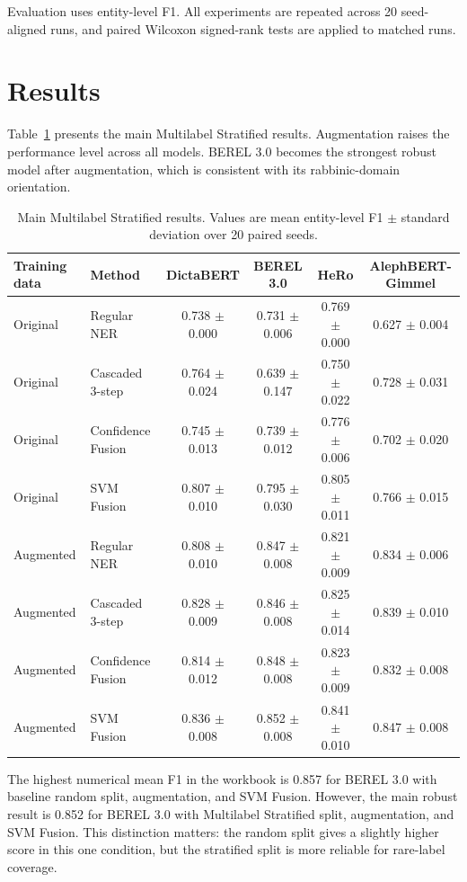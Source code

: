 \documentclass[11pt,a4paper]{article}
\begin{document}
Evaluation uses entity-level F1. All experiments are repeated across 20 seed-aligned runs, and paired Wilcoxon signed-rank tests are applied to matched runs.

\section{Results}
Table~\ref{tab:journal_multistrat} presents the main Multilabel Stratified results. Augmentation raises the performance level across all models. BEREL 3.0 becomes the strongest robust model after augmentation, which is consistent with its rabbinic-domain orientation.


\begin{table}[htbp]
\centering
\small
\caption{Main Multilabel Stratified results. Values are mean entity-level F1 $\pm$ standard deviation over 20 paired seeds.}
\label{tab:journal_multistrat}
\begin{tabular}{llcccc}
\toprule
Training data & Method & DictaBERT & BEREL 3.0 & HeRo & AlephBERT-Gimmel \\
\midrule
Original & Regular NER & 0.738 $\pm$ 0.000 & 0.731 $\pm$ 0.006 & 0.769 $\pm$ 0.000 & 0.627 $\pm$ 0.004 \\
Original & Cascaded 3-step & 0.764 $\pm$ 0.024 & 0.639 $\pm$ 0.147 & 0.750 $\pm$ 0.022 & 0.728 $\pm$ 0.031 \\
Original & Confidence Fusion & 0.745 $\pm$ 0.013 & 0.739 $\pm$ 0.012 & 0.776 $\pm$ 0.006 & 0.702 $\pm$ 0.020 \\
Original & SVM Fusion & 0.807 $\pm$ 0.010 & 0.795 $\pm$ 0.030 & 0.805 $\pm$ 0.011 & 0.766 $\pm$ 0.015 \\
\addlinespace[2pt]
Augmented & Regular NER & 0.808 $\pm$ 0.010 & 0.847 $\pm$ 0.008 & 0.821 $\pm$ 0.009 & 0.834 $\pm$ 0.006 \\
Augmented & Cascaded 3-step & 0.828 $\pm$ 0.009 & 0.846 $\pm$ 0.008 & 0.825 $\pm$ 0.014 & 0.839 $\pm$ 0.010 \\
Augmented & Confidence Fusion & 0.814 $\pm$ 0.012 & 0.848 $\pm$ 0.008 & 0.823 $\pm$ 0.009 & 0.832 $\pm$ 0.008 \\
Augmented & SVM Fusion & 0.836 $\pm$ 0.008 & 0.852 $\pm$ 0.008 & 0.841 $\pm$ 0.010 & 0.847 $\pm$ 0.008 \\
\bottomrule
\end{tabular}
\end{table}


The highest numerical mean F1 in the workbook is 0.857 for BEREL 3.0 with baseline random split, augmentation, and SVM Fusion. However, the main robust result is 0.852 for BEREL 3.0 with Multilabel Stratified split, augmentation, and SVM Fusion. This distinction matters: the random split gives a slightly higher score in this one condition, but the stratified split is more reliable for rare-label coverage.
\end{document}
